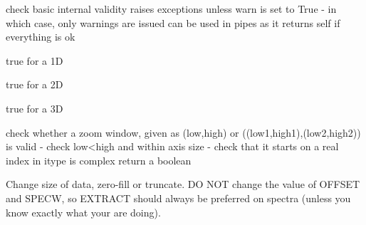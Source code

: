 \documentclass[letterpaper,10pt,openany,oneside]{sphinxmanual}
\begin{document}
\begin{fulllineitems}

\begin{fulllineitems}
\label{rst/code:NPKData.NPKData.check}
check basic internal validity
raises exceptions unless warn is set to True - in which case, only warnings are issued
can be used in pipes as it returns self if everything is ok

\end{fulllineitems}


\begin{fulllineitems}
\label{rst/code:NPKData.NPKData.check1D}
true for a 1D

\end{fulllineitems}


\begin{fulllineitems}
\label{rst/code:NPKData.NPKData.check2D}
true for a 2D

\end{fulllineitems}


\begin{fulllineitems}
\label{rst/code:NPKData.NPKData.check3D}
true for a 3D

\end{fulllineitems}


\begin{fulllineitems}
\label{rst/code:NPKData.NPKData.check_zoom}
check whether a zoom window, given as (low,high) or ((low1,high1),(low2,high2))  is valid
- check low\textless{}high and within axis size
- check that it starts on a real index in itype is complex
return a boolean

\end{fulllineitems}


\begin{fulllineitems}
\label{rst/code:NPKData.NPKData.chsize}
Change size of data, zero-fill or truncate. 
DO NOT change the value of OFFSET and SPECW, so EXTRACT should 
always be preferred on spectra (unless you know exactly what your are doing).


\end{fulllineitems}
\end{fulllineitems}
\end{document}
